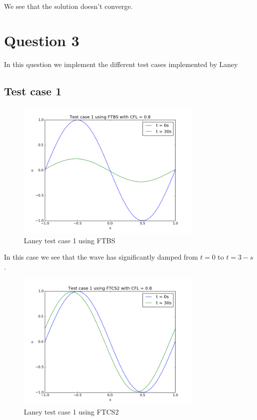 \documentclass[11pt, a4paper]{article}
\begin{document}
We see that the solution doesn't converge.

\section{Question 3}
In this question we implement the different test cases implemented by Laney
\subsection{Test case 1}
\begin{figure}
 \centering
 \includegraphics[width = 0.8\textwidth]{laney_t1_bs_1.png}
 \caption{Laney test case 1 using FTBS}
\end{figure}
In this case we see that the wave has significantly damped from $t = 0$ to $t = 3-s$.

\begin{figure}
 \centering
 \includegraphics[width = 0.8\textwidth]{laney_t1_cs2_1.png}
 \caption{Laney test case 1 using FTCS2}
\end{figure}
\end{document}
